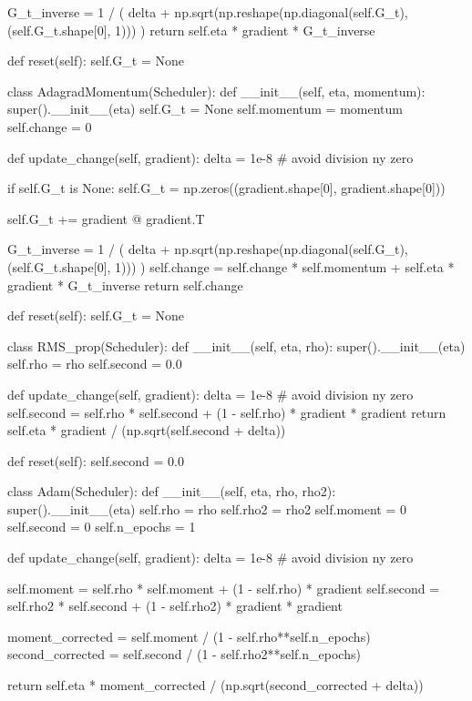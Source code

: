 \documentclass[%
oneside,                 %
final,                   %
10pt]{article}
\begin{document}
        G_t_inverse = 1 / (
            delta + np.sqrt(np.reshape(np.diagonal(self.G_t), (self.G_t.shape[0], 1)))
        )
        return self.eta * gradient * G_t_inverse

    def reset(self):
        self.G_t = None


class AdagradMomentum(Scheduler):
    def __init__(self, eta, momentum):
        super().__init__(eta)
        self.G_t = None
        self.momentum = momentum
        self.change = 0

    def update_change(self, gradient):
        delta = 1e-8  # avoid division ny zero

        if self.G_t is None:
            self.G_t = np.zeros((gradient.shape[0], gradient.shape[0]))

        self.G_t += gradient @ gradient.T

        G_t_inverse = 1 / (
            delta + np.sqrt(np.reshape(np.diagonal(self.G_t), (self.G_t.shape[0], 1)))
        )
        self.change = self.change * self.momentum + self.eta * gradient * G_t_inverse
        return self.change

    def reset(self):
        self.G_t = None


class RMS_prop(Scheduler):
    def __init__(self, eta, rho):
        super().__init__(eta)
        self.rho = rho
        self.second = 0.0

    def update_change(self, gradient):
        delta = 1e-8  # avoid division ny zero
        self.second = self.rho * self.second + (1 - self.rho) * gradient * gradient
        return self.eta * gradient / (np.sqrt(self.second + delta))

    def reset(self):
        self.second = 0.0


class Adam(Scheduler):
    def __init__(self, eta, rho, rho2):
        super().__init__(eta)
        self.rho = rho
        self.rho2 = rho2
        self.moment = 0
        self.second = 0
        self.n_epochs = 1

    def update_change(self, gradient):
        delta = 1e-8  # avoid division ny zero

        self.moment = self.rho * self.moment + (1 - self.rho) * gradient
        self.second = self.rho2 * self.second + (1 - self.rho2) * gradient * gradient

        moment_corrected = self.moment / (1 - self.rho**self.n_epochs)
        second_corrected = self.second / (1 - self.rho2**self.n_epochs)

        return self.eta * moment_corrected / (np.sqrt(second_corrected + delta))
\end{document}
